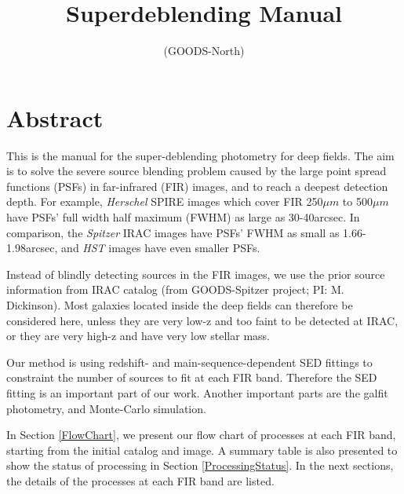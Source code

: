 \documentclass[11pt,a4paper]{article}
\author{}
\title{Superdeblending Manual}
\subtitle{(GOODS-North)}
\begin{document}
\maketitle
\tableofcontents
\clearpage
\setlength{\baselineskip}{16pt}
\setlength{\parskip}{5pt}

\section{Abstract}

This is the manual for the super-deblending photometry for deep fields. The aim is to solve the severe source blending problem caused by the large point spread functions (PSFs) in far-infrared (FIR) images, and to reach a deepest detection depth. For example, \textit{Herschel} SPIRE images which cover FIR 250${\mu}m$ to 500${\mu}m$ have PSFs' full width half maximum (FWHM) as large as 30-40arcsec. In comparison, the \textit{Spitzer} IRAC images have PSFs' FWHM as small as 1.66-1.98arcsec, and \textit{HST} images have even smaller PSFs. 

Instead of blindly detecting sources in the FIR images, we use the prior source information from IRAC catalog (from GOODS-Spitzer project; PI: M. Dickinson). Most galaxies located inside the deep fields can therefore be considered here, unless they are very low-z and too faint to be detected at IRAC, or they are very high-z and have very low stellar mass. 

Our method is using redshift- and main-sequence-dependent SED fittings to constraint the number of sources to fit at each FIR band. Therefore the SED fitting is an important part of our work. Another important parts are the galfit photometry, and Monte-Carlo simulation. 

In Section \ref{FlowChart}, we present our flow chart of processes at each FIR band, starting from the initial catalog and image. A summary table is also presented to show the status of processing in Section \ref{ProcessingStatus}. In the next sections, the details of the processes at each FIR band are listed. 
\end{document}
